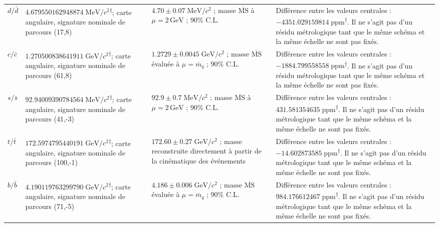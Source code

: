 \begin{longtable}{@{}>{\raggedright\arraybackslash}p{}>{\raggedright\arraybackslash}p{}>{\raggedright\arraybackslash}p{}>{\raggedright\arraybackslash}p{}@{}}
$d/\bar d$ & $4.679550\allowbreak{}162948\allowbreak{}874\;\mathrm{MeV}/c^2$\textsuperscript{\(\dagger\)}; carte angulaire, signature nominale de parcours (17,8) & $4.70\pm0.07\;\mathrm{MeV}/c^2$ ; masse $\overline{\mathrm{MS}}$ à $\mu=2\,\mathrm{GeV}$ ; 90\% C.L. & Différence entre les valeurs centrales : $-4351.029159\allowbreak{}814\;\mathrm{ppm}$\textsuperscript{\(\dagger\)}. Il ne s’agit pas d’un résidu métrologique tant que le même schéma et la même échelle ne sont pas fixés. \\
$c/\bar c$ & $1.270500\allowbreak{}838641\allowbreak{}911\;\mathrm{GeV}/c^2$\textsuperscript{\(\dagger\)}; carte angulaire, signature nominale de parcours (61,8) & $1.2729\pm0.0045\;\mathrm{GeV}/c^2$ ; masse $\overline{\mathrm{MS}}$ évaluée à $\mu=\overline{m}_q$ ; 90\% C.L. & Différence entre les valeurs centrales : $-1884.799558\allowbreak{}558\;\mathrm{ppm}$\textsuperscript{\(\dagger\)}. Il ne s’agit pas d’un résidu métrologique tant que le même schéma et la même échelle ne sont pas fixés. \\
$s/\bar s$ & $92.940093\allowbreak{}907845\allowbreak{}64\;\mathrm{MeV}/c^2$\textsuperscript{\(\dagger\)}; carte angulaire, signature nominale de parcours (41,-3) & $92.9\pm0.7\;\mathrm{MeV}/c^2$ ; masse $\overline{\mathrm{MS}}$ à $\mu=2\,\mathrm{GeV}$ ; 90\% C.L. & Différence entre les valeurs centrales : $431.581354\allowbreak{}635\;\mathrm{ppm}$\textsuperscript{\(\dagger\)}. Il ne s’agit pas d’un résidu métrologique tant que le même schéma et la même échelle ne sont pas fixés. \\
$t/\bar t$ & $172.597479\allowbreak{}544019\allowbreak{}1\;\mathrm{GeV}/c^2$\textsuperscript{\(\dagger\)}; carte angulaire, signature nominale de parcours (100,-1) & $172.60\pm0.27\;\mathrm{GeV}/c^2$ ; masse reconstruite directement à partir de la cinématique des événements & Différence entre les valeurs centrales : $-14.602873\allowbreak{}585\;\mathrm{ppm}$\textsuperscript{\(\dagger\)}. Il ne s’agit pas d’un résidu métrologique tant que le même schéma et la même échelle ne sont pas fixés. \\
$b/\bar b$ & $4.190119\allowbreak{}763299\allowbreak{}790\;\mathrm{GeV}/c^2$\textsuperscript{\(\dagger\)}; carte angulaire, signature nominale de parcours (71,-5) & $4.186\pm0.006\;\mathrm{GeV}/c^2$ ; masse $\overline{\mathrm{MS}}$ évaluée à $\mu=\overline{m}_q$ ; 90\% C.L. & Différence entre les valeurs centrales : $984.176612\allowbreak{}467\;\mathrm{ppm}$\textsuperscript{\(\dagger\)}. Il ne s’agit pas d’un résidu métrologique tant que le même schéma et la même échelle ne sont pas fixés. \\

\end{longtable}
